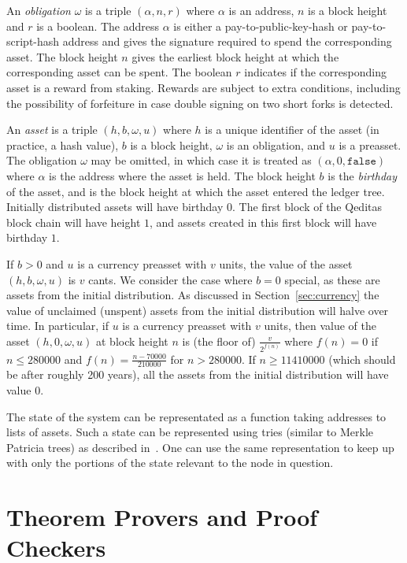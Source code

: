 \documentclass{article}
\begin{document}
An {\em{obligation}} $\omega$ is a triple $(\alpha,n,r)$ where $\alpha$
is an address, $n$ is a block height and $r$ is a boolean.
The address $\alpha$ is either a pay-to-public-key-hash or pay-to-script-hash address
and gives the signature required to spend the corresponding asset.
The block height $n$ gives the earliest block height at which the corresponding asset
can be spent. The boolean $r$ indicates if the corresponding asset is a reward
from staking. Rewards are subject to extra conditions, including the possibility
of forfeiture in case double signing on two short forks is detected.

An {\em{asset}} is a triple $(h,b,\omega,u)$
where $h$ is a unique identifier of the asset (in practice, a hash value),
$b$ is a block height,
$\omega$ is an obligation, and $u$ is a preasset.
The obligation $\omega$ may be omitted, in which case it is treated as
$(\alpha,0,{\mathtt{false}})$ where $\alpha$ is the address where the asset is held.
The block height $b$ is the {\emph{birthday}} of the asset, and is
the block height at which the asset entered the ledger tree.
Initially distributed assets will have birthday $0$.
The first block of the Qeditas block chain will have height $1$,
and assets created in this first block will have birthday $1$.

If $b>0$ and $u$ is a currency preasset with $v$ units, the value of the asset $(h,b,\omega,u)$
is $v$ cants.
We consider the case where $b=0$ special, as these are assets from the initial distribution.
As discussed in Section~\ref{sec:currency} the value of unclaimed (unspent) assets from the initial distribution
will halve over time. In particular, if $u$ is a currency preasset with $v$ units,
then value of the asset $(h,0,\omega,u)$ at block height $n$
is (the floor of) $\frac{v}{2^{f(n)}}$ where $f(n) = 0$ if $n \leq 280000$
and $f(n) = \frac{n-70000}{210000}$ for $n > 280000$.
If $n \geq 11410000$ (which should be after roughly 200 years),
all the assets from the initial distribution will have value $0$.

The state of the system can be representated as a function taking addresses
to lists of assets.
Such a state can be represented using tries (similar to Merkle Patricia trees)
as described in~\cite{White2015b}.
One can use the same representation to keep up with only the portions of the state
relevant to the node in question.

\section{Theorem Provers and Proof Checkers}\label{sec:provers}
\end{document}
